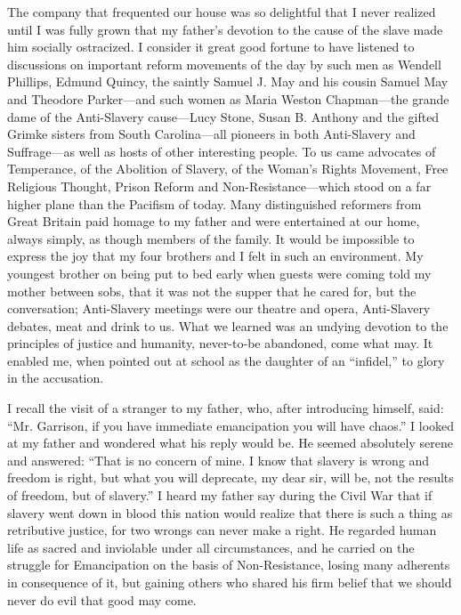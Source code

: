 \documentclass{book}
\begin{document}
The company that frequented our house was so delightful that I never realized until I was fully grown that my father’s devotion to the cause of the slave made him socially ostracized. I consider it great good fortune to have listened to discussions on important reform movements of the day by such men as Wendell Phillips, Edmund Quincy, the saintly Samuel J. May and his cousin Samuel May and Theodore Parker—and such women as Maria Weston Chapman—the grande dame of the Anti-Slavery cause—Lucy Stone, Susan B. Anthony and the gifted Grimke sisters from South Carolina—all pioneers in both Anti-Slavery and Suffrage—as well as hosts of other interesting people. To us came advocates of Temperance, of the Abolition of Slavery, of the Woman’s Rights Movement, Free Religious Thought, Prison Reform and Non-Resistance—which stood on a far higher plane than the Pacifism of today. Many distinguished reformers from Great Britain paid homage to my father and were entertained at our home, always simply, as though members of the family. It would be impossible to express the joy that my four brothers and I felt in such an environment. My youngest brother on being put to bed early when guests were coming told my mother between sobs, that it was not the supper that he cared for, but the conversation; Anti-Slavery meetings were our theatre and opera, Anti-Slavery debates, meat and drink to us. What we learned was an undying devotion to the principles of justice and humanity, never-to-be abandoned, come what may. It enabled me, when pointed out at school as the daughter of an “infidel,” to glory in the accusation.

I recall the visit of a stranger to my father, who, after introducing himself, said: “Mr. Garrison, if you have immediate emancipation you will have chaos.” I looked at my father and wondered what his reply would be. He seemed absolutely serene and answered: “That is no concern of mine. I know that slavery is wrong and freedom is right, but what you will deprecate, my dear sir, will be, not the results of freedom, but of slavery.” I heard my father say during the Civil War that if slavery went down in blood this nation would realize that there is such a thing as retributive justice, for two wrongs can never make a right. He regarded human life as sacred and inviolable under all circumstances, and he carried on the struggle for Emancipation on the basis of Non-Resistance, losing many adherents in consequence of it, but gaining others who shared his firm belief that we should never do evil that good may come.
\end{document}
